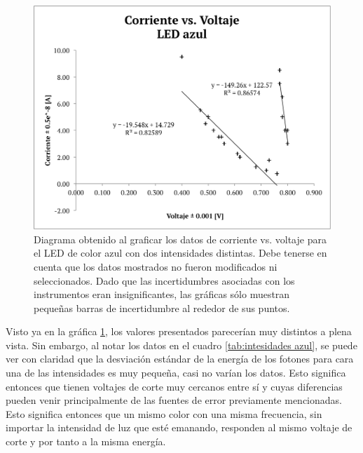 \documentclass[%
 reprint,
 amsmath,amssymb,
 aps,
]{revtex4-1}
\begin{document}
\begin{figure}[H]
    \centering
    \includegraphics[scale= 0.53]{AZUL.png}
    \caption{Diagrama obtenido al graficar los datos de corriente vs. voltaje para el LED de color azul con dos intensidades distintas. Debe tenerse en cuenta que los datos mostrados no fueron modificados ni seleccionados. Dado que las incertidumbres asociadas con los instrumentos eran insignificantes, las gráficas sólo muestran pequeñas barras de incertidumbre al rededor de sus puntos.}
    \label{fig:azules}
\end{figure}

Visto ya en la gráfica \ref{fig:azules}, los valores presentados parecerían muy distintos a plena vista. Sin embargo, al notar los datos en el cuadro \ref{tab:intesidades azul}, se puede ver con claridad que la desviación estándar de la energía de los fotones para cara una de las intensidades es muy pequeña, casi no varían los datos. Esto significa entonces que tienen voltajes de corte muy cercanos entre sí y cuyas diferencias pueden venir principalmente de las fuentes de error previamente mencionadas. Esto significa entonces que un mismo color con una misma frecuencia, sin importar la intensidad de luz que esté emanando, responden al mismo voltaje de corte y por tanto a la misma energía.
\end{document}
